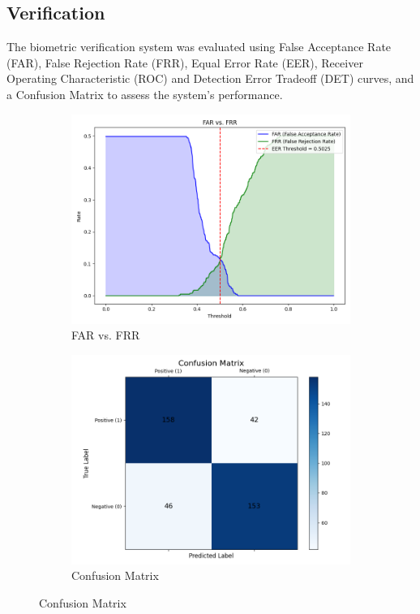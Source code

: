 \subsection{Verification}

The biometric verification system was evaluated using False Acceptance Rate (FAR), False Rejection Rate (FRR), Equal Error Rate (EER), Receiver Operating Characteristic (ROC) and Detection Error Tradeoff (DET) curves, and a Confusion Matrix to assess the system's performance.

\begin{figure}[!ht]
    \centering
    \begin{subfigure}[t]{0.48\columnwidth}
        \includegraphics[width=\textwidth]{./images/plots/ver/far_vs_frr.png}
        \caption{FAR vs. FRR}
        \label{fig:far_vs_frr}
    \end{subfigure}
    \hfill
    \begin{subfigure}[t]{0.48\columnwidth}
        \includegraphics[width=\textwidth]{./images/plots/ver/confusion_matrix.png}
        \caption{Confusion Matrix}
        \label{fig:confusion_matrix}
    \end{subfigure}
\end{figure}

